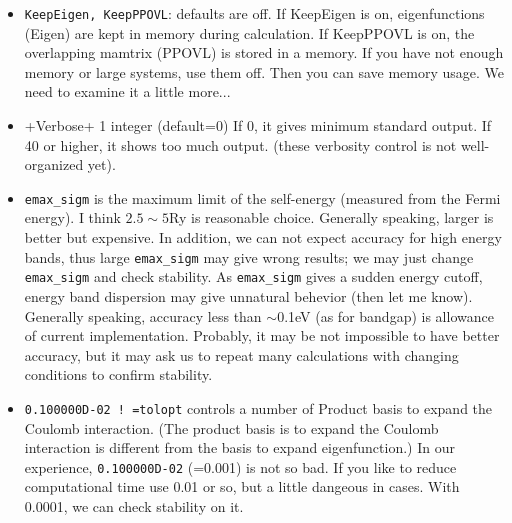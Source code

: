 \documentclass[a4paper,10pt,epsf,fleqn]{article}
\begin{document}
\begin{itemize}
\item \verb+KeepEigen, KeepPPOVL+:
      defaults are off.
If KeepEigen is on, eigenfunctions (Eigen) are kept in memory during calculation.
If KeepPPOVL is on, the overlapping mamtrix (PPOVL) is stored 
in a memory. If you have not enough memory or large systems, use them
off.  Then you can save memory usage. We need to examine it a little more...

\item+Verbose+ 1 integer (default=0)
If 0, it gives minimum standard output. 
If 40 or higher, it shows too much output.
(these verbosity control is not well-organized yet). 

\item
\verb+emax_sigm+ is the maximum limit of the self-energy 
(measured from the Fermi energy). I think $2.5\sim5$Ry is reasonable
choice. 
Generally speaking, larger is better but expensive.
In addition, we can not expect accuracy for high energy bands,
thus large \verb+emax_sigm+ may give wrong results; we may just change
\verb+emax_sigm+ and check stability. 
As \verb+emax_sigm+ gives a sudden energy cutoff, 
energy band dispersion may give unnatural behevior (then let me know). 
Generally speaking, accuracy less than $\sim$0.1eV (as for bandgap) 
is allowance of current implementation. 
Probably, it may be not impossible to have better accuracy, 
but it may ask us to repeat many calculations with changing conditions
to confirm stability. 

\item
\verb+0.100000D-02 ! =tolopt+ controls a number of Product basis
to expand the Coulomb interaction. (The product basis is to expand the
Coulomb interaction is different from the basis to expand eigenfunction.)
In our experience, \verb+0.100000D-02+ (=0.001) is not so bad.
If you like to reduce computational time use 0.01 or so, but a little
dangeous in cases. With 0.0001, we can check stability on it.


\end{itemize}
\end{document}

